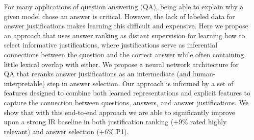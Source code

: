 For many applications of question answering (QA), being able to explain why a given model chose an answer is critical.  However, the lack of labeled data for answer justifications makes learning this difficult and expensive.  Here we propose an approach that uses answer ranking as distant supervision for learning how to select informative justifications, where justifications serve as inferential connections between the question and the correct answer while often containing little lexical overlap with either. We propose a neural network architecture for QA that reranks answer justifications as an intermediate (and human-interpretable) step in answer selection. Our approach is informed by a set of features designed to combine both learned representations and explicit features to capture the connection between questions, answers, and answer justifications. We show that with this end-to-end approach we are able to significantly improve upon a strong IR baseline in both justification ranking (+9\% rated highly relevant) and answer selection (+6\% P\@1).
